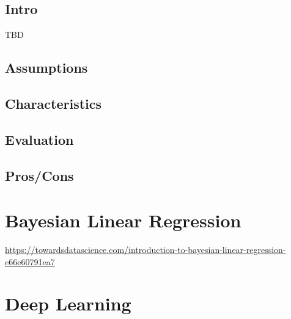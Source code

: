 \documentclass[]{book}
\theoremstyle{definition}
\theoremstyle{definition}
\theoremstyle{definition}
\theoremstyle{remark}
\begin{document}
\subsection{Intro}\label{intro-18}

TBD

\subsection{Assumptions}\label{assumptions-18}

\subsection{Characteristics}\label{characteristics-13}

\subsection{Evaluation}\label{evaluation-17}

\subsection{Pros/Cons}\label{proscons-18}

\section{Bayesian Linear Regression}\label{bayesian-linear-regression}

\url{https://towardsdatascience.com/introduction-to-bayesian-linear-regression-e66e60791ea7}

\section{Deep Learning}\label{deep-learning}
\end{document}
